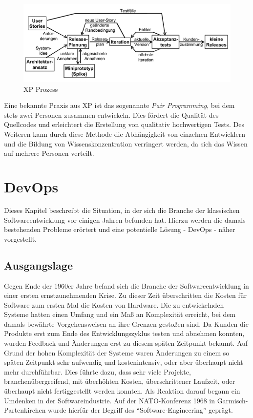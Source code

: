 \begin{figure}
  \centering
  \includegraphics[width=\textwidth]{img/xpmodell.png}
  \caption{XP Prozess \parencite[][S. 46]{Schatten:2010aa}}
  \label{fig:xpmodell}
\end{figure}

Eine bekannte Praxis aus XP ist das sogenannte \emph{Pair Programming}, bei dem stets zwei Personen zusammen entwickeln.
Dies fördert die Qualität des Quellcodes und erleichtert die Erstellung von qualitativ hochwertigen Tests.
Des Weiteren kann durch diese Methode die Abhängigkeit von einzelnen Entwicklern und die Bildung von Wissenskonzentration verringert werden, da sich das Wissen auf mehrere Personen verteilt.

\section{DevOps} %
Dieses Kapitel beschreibt die Situation, in der sich die Branche der klassischen Softwareentwicklung vor einigen Jahren befunden hat. Hierzu werden die damals bestehenden Probleme erörtert und eine potentielle Lösung - DevOps - näher vorgestellt.

\subsection{Ausgangslage}
Gegen Ende der 1960er Jahre befand sich die Branche der Softwareentwicklung in einer ersten ernstzunehmenden Krise. Zu dieser Zeit überschritten die Kosten für Software zum ersten Mal die Kosten von Hardware. Die zu entwickelnden Systeme hatten einen Umfang und ein Maß an Komplexität erreicht, bei dem damals bewährte Vorgehensweisen an ihre Grenzen gestoßen sind. Da Kunden die Produkte erst zum Ende des Entwicklungszyklus testen und abnehmen konnten, wurden Feedback und Änderungen erst zu diesem späten Zeitpunkt bekannt. Auf Grund der hohen Komplexität der Systeme waren Änderungen zu einem so späten Zeitpunkt sehr aufwendig und kostenintensiv, oder aber überhaupt nicht mehr durchführbar. Dies führte dazu, dass sehr viele Projekte, branchenübergreifend, mit überhöhten Kosten, überschrittener Laufzeit, oder überhaupt nicht fertiggestellt werden konnten.
Als Reaktion darauf begann ein Umdenken in der Softwareindustrie. Auf der NATO-Konferenz 1968 in Garmisch-Partenkirchen wurde hierfür der Begriff des \enquote{Software-Engineering} geprägt. \parencite[Vgl.][S. 8]{Naur:1968} 

